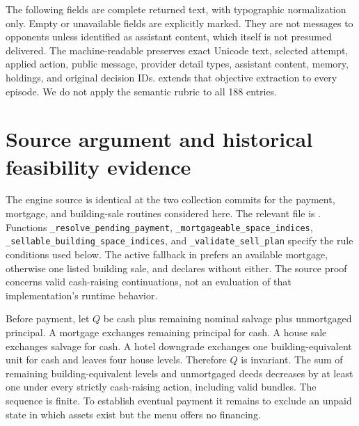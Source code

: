 \clearpage
The following fields are complete returned text, with typographic normalization only. Empty or unavailable fields are explicitly marked. They are not messages to opponents unless identified as assistant content, which itself is not presumed delivered. The machine-readable  preserves exact Unicode text, selected attempt, applied action, public message, provider detail types, assistant content, memory, holdings, and original decision IDs.  extends that objective extraction to every episode. We do not apply the semantic rubric to all 188 entries.



\section{Source argument and historical feasibility evidence}
\label{app:proof}

The engine source is identical at the two collection commits for the payment, mortgage, and building-sale routines considered here. The relevant file is . Functions \texttt{\_resolve\_pending\_payment}, \texttt{\_mortgageable\_space\_indices}, \texttt{\_sellable\_building\_space\_indices}, and \texttt{\_validate\_sell\_plan} specify the rule conditions used below. The active fallback in  prefers an available mortgage, otherwise one listed building sale, and declares without either. The source proof concerns valid cash-raising continuations, not an evaluation of that implementation's runtime behavior.

Before payment, let $Q$ be cash plus remaining nominal salvage plus unmortgaged principal. A mortgage exchanges remaining principal for cash. A house sale exchanges salvage for cash. A hotel downgrade exchanges one building-equivalent unit for cash and leaves four house levels. Therefore $Q$ is invariant. The sum of remaining building-equivalent levels and unmortgaged deeds decreases by at least one under every strictly cash-raising action, including valid bundles. The sequence is finite. To establish eventual payment it remains to exclude an unpaid state in which assets exist but the menu offers no financing.

